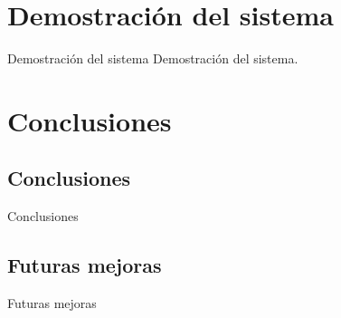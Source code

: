 \documentclass[10pt, hyperref={pdfpagelabels=false}]{beamer}
\begin{document}
  \section{Demostración del sistema}
    \begin{frame}{Demostración del sistema}
      Demostración del sistema.
    \end{frame}


  \section{Conclusiones}
    \subsection{Conclusiones}
      \begin{frame}{Conclusiones}

      \end{frame}

    \subsection{Futuras mejoras}
      \begin{frame}{Futuras mejoras}

      \end{frame}
\end{document}
